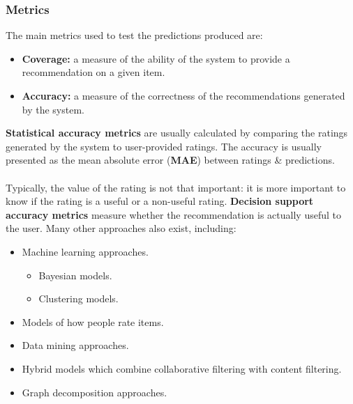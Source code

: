 \documentclass[a4paper,11pt]{article}
\begin{document}
\subsubsection{Metrics}
The main metrics used to test the predictions produced are:
\begin{itemize}
    \item   \textbf{Coverage:} a measure of the ability of the system to provide a recommendation on a given item.
    \item   \textbf{Accuracy:} a measure of the correctness of the recommendations generated by the system.
\end{itemize}

\textbf{Statistical accuracy metrics} are usually calculated by comparing the ratings generated by the system to user-provided ratings.
The accuracy is usually presented as the mean absolute error (\textbf{MAE}) between ratings \& predictions.
\\\\
Typically, the value of the rating is not that important: it is more important to know if the rating is a useful or a non-useful rating.
\textbf{Decision support accuracy metrics} measure whether the recommendation is actually useful to the user.
Many other approaches also exist, including:
\begin{itemize}
    \item   Machine learning approaches.
            \begin{itemize}
                \item   Bayesian models.
                \item   Clustering models.
            \end{itemize}
    \item   Models of how people rate items.
    \item   Data mining approaches.
    \item   Hybrid models which combine collaborative filtering with content filtering.
    \item   Graph decomposition approaches.
\end{itemize}
\end{document}
